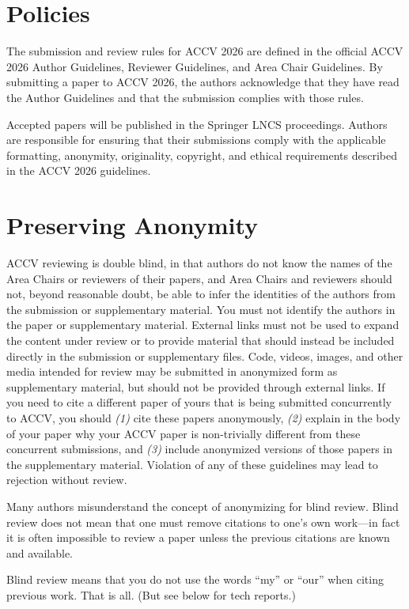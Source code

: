\documentclass[runningheads]{llncs}
\begin{document}
\section{Policies}
The submission and review rules for ACCV 2026 are defined in the official ACCV 2026 Author Guidelines, Reviewer Guidelines, and Area Chair Guidelines. By submitting a paper to ACCV 2026, the authors acknowledge that they have read the Author Guidelines and that the submission complies with those rules.

Accepted papers will be published in the Springer LNCS proceedings. Authors are responsible for ensuring that their submissions comply with the applicable formatting, anonymity, originality, copyright, and ethical requirements described in the ACCV 2026 guidelines.

\section{Preserving Anonymity}
\label{sec:blind}
ACCV reviewing is double blind, in that authors do not know the names of the Area Chairs or reviewers of their papers, and Area Chairs and reviewers should not, beyond reasonable doubt, be able to infer the identities of the authors from the submission or supplementary material.
You must not identify the authors in the paper or supplementary material. External links must not be used to expand the content under review or to provide material that should instead be included directly in the submission or supplementary files. Code, videos, images, and other media intended for review may be submitted in anonymized form as supplementary material, but should not be provided through external links.
If you need to cite a different paper of yours that is being submitted concurrently to ACCV, you should \emph{(1)} cite these papers anonymously, \emph{(2)} explain in the body of your paper why your ACCV paper is non-trivially different from these concurrent submissions, and \emph{(3)} include anonymized versions of those papers in the supplementary material.
Violation of any of these guidelines may lead to rejection without review.

Many authors misunderstand the concept of anonymizing for blind review.
Blind review does not mean that one must remove citations to one's own work---in fact it is often impossible to review a paper unless the previous citations are known and available.

Blind review means that you do not use the words ``my'' or ``our'' when citing previous work.
That is all.
(But see below for tech reports.)
\end{document}
